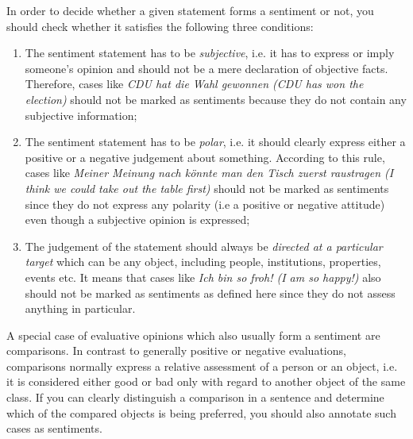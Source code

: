 \documentclass[11pt,a4paper]{article}
\begin{document}
In order to decide whether a given statement forms a sentiment or not,
you should check whether it satisfies the following three conditions:
\begin{enumerate}
  \item The sentiment statement has to be \textit{subjective}, i.e. it has to
    express or imply someone's opinion and should not be a mere declaration of
    objective facts.  Therefore, cases like \textit{CDU hat die Wahl gewonnen
      (CDU has won the election)} should not be marked as sentiments because
    they do not contain any subjective information;

  \item The sentiment statement has to be \textit{polar}, i.e. it
    should clearly express either a positive or a negative judgement
    about something.  According to this rule, cases like
    \textit{Meiner Meinung nach k\"onnte man den Tisch zuerst
      raustragen (I think we could take out the table first)} should
    not be marked as sentiments since they do not express any polarity
    (i.e a positive or negative attitude) even though a subjective
    opinion is expressed;

  \item The judgement of the statement should always be
    \textit{directed at a particular target} which can be any object,
    including people, institutions, properties, events etc.  It means
    that cases like \textit{Ich bin so froh! (I am so happy!)} also
    should not be marked as sentiments as defined here since they do
    not assess anything in particular.
\end{enumerate}

A special case of evaluative opinions which also usually form a
sentiment are comparisons.  In contrast to generally positive or
negative evaluations, comparisons normally express a relative
assessment of a person or an object, i.e. it is considered either good
or bad only with regard to another object of the same class.  If you
can clearly distinguish a comparison in a sentence and determine which
of the compared objects is being preferred, you should also annotate
such cases as sentiments.
\end{document}
